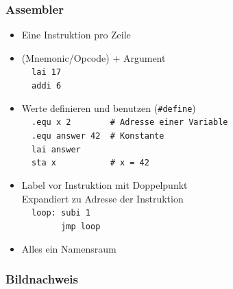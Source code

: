 \documentclass[t,aspectratio=169,usenames,dvipsnames]{beamer}
\begin{document}
\begin{frame}
  \frametitle{Assembler}

  \begin{itemize}
  \item Eine Instruktion pro Zeile
  \item (Mnemonic/Opcode) + Argument\\
    \texttt{~~lai 17}\\
    \texttt{~~addi 6}
  \item Werte definieren und benutzen (\texttt{\#define})\\
    \texttt{~~.equ x 2~~~~~~~~\# Adresse einer Variable}\\
    \texttt{~~.equ answer 42~~\# Konstante}\\
    \texttt{~~lai answer}\\
    \texttt{~~sta x~~~~~~~~~~~\# x = 42}\\
  \item Label vor Instruktion mit Doppelpunkt\\
    Expandiert zu Adresse der Instruktion\\
    \texttt{~~loop: subi 1}\\
    \texttt{~~~~~~~~jmp loop}
  \item Alles ein Namensraum
  \end{itemize}
\end{frame}

\begin{frame}
  \frametitle{Bildnachweis}
  \tiny
  \begin{description}
  \end{description}
\end{frame}
\end{document}
